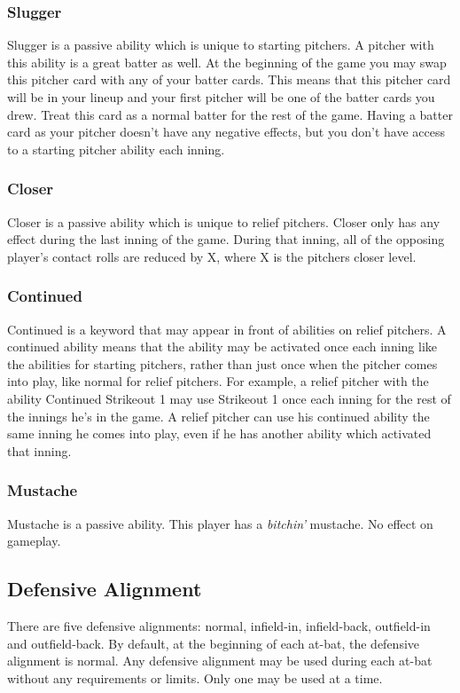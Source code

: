 \documentclass[12pt]{article} %
\begin{document}
\subsubsection{Slugger}
Slugger is a passive ability which is unique to starting pitchers.  A pitcher with this ability is a great batter as well.  At the beginning of the game you may swap this pitcher card with any of your batter cards.  This means that this pitcher card will be in your lineup and your first pitcher will be one of the batter cards you drew.  Treat this card as a normal batter for the rest of the game.  Having a batter card as your pitcher doesn't have any negative effects, but you don't have access to a starting pitcher ability each inning.

\subsubsection{Closer}
Closer is a passive ability which is unique to relief pitchers.  Closer only has any effect during the last inning of the game.  During that inning, all of the opposing player's contact rolls are reduced by X, where X is the pitchers closer level.
 
\subsubsection{Continued}
Continued is a keyword that may appear in front of abilities on relief pitchers.  A continued ability means that the ability may be activated once each inning like the abilities for starting pitchers, rather than just once when the pitcher comes into play, like normal for relief pitchers.  For example, a relief pitcher with the ability Continued Strikeout 1 may use Strikeout 1 once each inning for the rest of the innings he's in the game.  A relief pitcher can use his continued ability the same inning he comes into play, even if he has another ability which activated that inning.

\subsubsection{Mustache}
Mustache is a passive ability. This player has a \emph{bitchin'} mustache.  No effect on gameplay.

\subsection{Defensive Alignment}
There are five defensive alignments: normal, infield-in, infield-back, outfield-in and outfield-back.  By default, at the beginning of each at-bat, the defensive alignment is normal.  Any defensive alignment may be used during each at-bat without any requirements or limits.  Only one may be used at a time.
\end{document}
